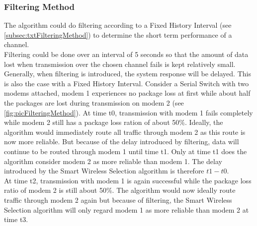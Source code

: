 \subsubsection{Filtering Method}
%
The algorithm could do filtering according to a Fixed History Interval (see \autoref{subsec:txtFilteringMethod}) to determine the short term performance of a channel. \\
Filtering could be done over an interval of 5 seconds so that the amount of data lost when transmission over the chosen channel fails is kept relatively small.\\
Generally, when filtering is introduced, the system response will be delayed. This is also the case with a Fixed History Interval. Consider a Serial Switch with two modems attached, modem 1 experiences no package loss at first while about half the packages are lost during transmission on modem 2 (see \autoref{fig:picFilteringMethod}). At time t0, transmission with modem 1 fails completely while modem 2 still has a package loss ration of about 50\%. Ideally, the algorithm would immediately route all traffic through modem 2 as this route is now more reliable. But because of the delay introduced by filtering, data will continue to be routed through modem 1 until time t1. Only at time t1 does the algorithm consider modem 2 as more reliable than modem 1. The delay introduced by the Smart Wireless Selection algorithm is therefore $t1 - t0$.\\
At time t2, transmission with modem 1 is again successful while the package loss ratio of modem 2 is still about 50\%. The algorithm would now ideally route traffic through modem 2 again but because of filtering, the Smart Wireless Selection algorithm will only regard modem 1 as more reliable than modem 2 at time t3.
%
